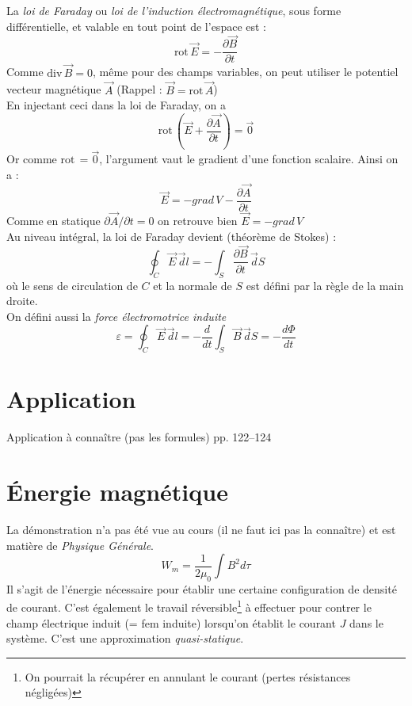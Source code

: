 \documentclass	[11pt, a4paper, openany]{book}
\newcommand{\rot}{\text{rot}\,}
\newcommand{\divv}{\text{div}\,}
\begin{document}
La \textit{loi de Faraday} ou \textit{loi de l'induction électromagnétique}, sous forme différentielle, et valable en tout point de l'espace est : \begin{equation}
\rot\vec E=-\frac{\partial \vec B}{\partial t}
\end{equation}
Comme $\divv\vec B=0$, même pour des champs variables, on peut utiliser le potentiel vecteur magnétique $\vec A$ (Rappel : $\vec B=\rot\vec A$)\\
En injectant ceci dans la loi de Faraday, on a \begin{equation}
\rot\left(\vec E+\frac{\partial \vec A}{\partial t}\right)=\vec{0}
\end{equation}
Or comme $\rot =\vec{0}$, l'argument vaut le gradient d'une fonction scalaire. Ainsi on a : \begin{equation}
\vec E=-grad\,V-\frac{\partial\vec A}{\partial t}
\end{equation}
Comme en statique $\partial\vec A/\partial t=0$ on retrouve bien $\vec E=-grad\,V$\\
Au niveau intégral, la loi de Faraday devient (théorème de Stokes) : \begin{equation}
\oint_C\vec E\,\vec dl=-\int_S\frac{\partial\vec B}{\partial t}\,\vec dS
\end{equation}où le sens de circulation de $C$ et la normale de $S$ est défini par la règle de la main droite.\\
On défini aussi la \textit{force électromotrice induite}\begin{equation}
\varepsilon=\oint_C\vec E\,\vec dl=-\frac{d}{dt}\int_S\vec B\,\vec dS=-\frac{d\Phi}{dt}
\end{equation}
\setcounter{section}{2}
\section{Application}
Application à connaître (pas les formules) pp. 122--124
\section{Énergie magnétique}
La démonstration n'a pas été vue au cours (il ne faut ici pas la connaître) et est matière de \textit{Physique Générale}.
\begin{equation}
W_m = \frac{1}{2\mu_0}\int B^2 d\tau
\end{equation}
Il s'agit de l'énergie nécessaire pour établir une certaine configuration de densité de courant. C'est également le travail réversible\footnote{On pourrait la récupérer en annulant le courant (pertes résistances négligées)} à effectuer pour contrer le champ électrique induit (= fem induite) lorsqu'on établit le courant $J$ dans le système. C'est une approximation \textit{quasi-statique}.
\end{document}
